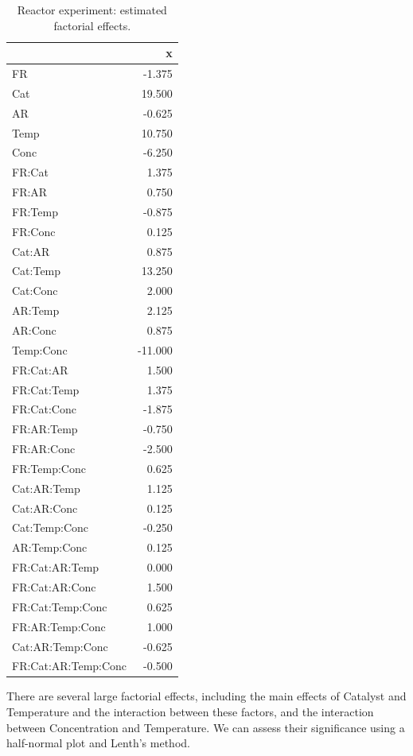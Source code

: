 \documentclass[
]{book}
\theoremstyle{definition}
\theoremstyle{definition}
\theoremstyle{definition}
\theoremstyle{definition}
\theoremstyle{remark}
\begin{document}
\begin{table}

\caption{\label{tab:reactor-estimate}Reactor experiment: estimated factorial effects.}
\centering
\begin{tabular}[t]{l|r}
\hline
  & x\\
\hline
FR & -1.375\\
\hline
Cat & 19.500\\
\hline
AR & -0.625\\
\hline
Temp & 10.750\\
\hline
Conc & -6.250\\
\hline
FR:Cat & 1.375\\
\hline
FR:AR & 0.750\\
\hline
FR:Temp & -0.875\\
\hline
FR:Conc & 0.125\\
\hline
Cat:AR & 0.875\\
\hline
Cat:Temp & 13.250\\
\hline
Cat:Conc & 2.000\\
\hline
AR:Temp & 2.125\\
\hline
AR:Conc & 0.875\\
\hline
Temp:Conc & -11.000\\
\hline
FR:Cat:AR & 1.500\\
\hline
FR:Cat:Temp & 1.375\\
\hline
FR:Cat:Conc & -1.875\\
\hline
FR:AR:Temp & -0.750\\
\hline
FR:AR:Conc & -2.500\\
\hline
FR:Temp:Conc & 0.625\\
\hline
Cat:AR:Temp & 1.125\\
\hline
Cat:AR:Conc & 0.125\\
\hline
Cat:Temp:Conc & -0.250\\
\hline
AR:Temp:Conc & 0.125\\
\hline
FR:Cat:AR:Temp & 0.000\\
\hline
FR:Cat:AR:Conc & 1.500\\
\hline
FR:Cat:Temp:Conc & 0.625\\
\hline
FR:AR:Temp:Conc & 1.000\\
\hline
Cat:AR:Temp:Conc & -0.625\\
\hline
FR:Cat:AR:Temp:Conc & -0.500\\
\hline
\end{tabular}
\end{table}

There are several large factorial effects, including the main effects of Catalyst and Temperature and the interaction between these factors, and the interaction between Concentration and Temperature. We can assess their significance using a half-normal plot and Lenth's method.
\end{document}
